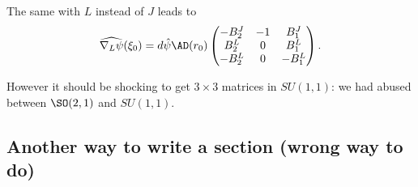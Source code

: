The same with $L$ instead of $J$ leads to
\begin{equation} \label{eq_nabLmoi}
	\widehat{\nabla_L \psi}(\xi_0)=d\hat{\psi}\AD(r_0)\begin{pmatrix}
		-B_2^J & -1 & B_1^J  \\
		B_2^L  & 0  & B_1^L  \\
		-B_2^L & 0  & -B_1^L
	\end{pmatrix}.
\end{equation}

However it should be shocking to get $3\times 3$ matrices in $SU(1,1)$: we had abused between $\SO(2,1)$ and $SU(1,1)$.

\subsection{Another way to write a section (wrong way to do)}

